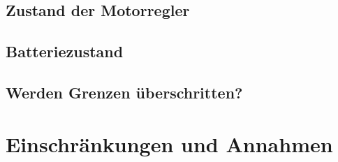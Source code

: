 \subsection{Zustand der Motorregler}


\subsection{Batteriezustand}
\subsection{Werden Grenzen überschritten?}
\section{Einschränkungen und Annahmen}